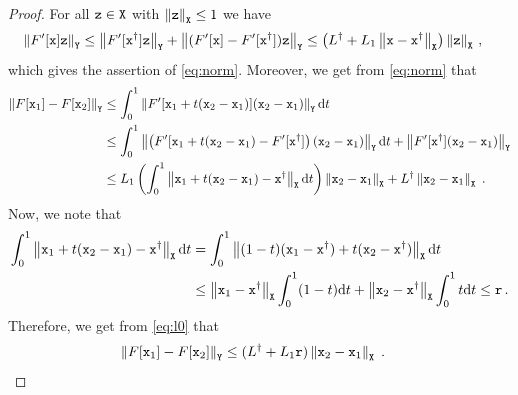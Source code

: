 \documentclass[10pt,a4paper]{amsart}
\newcommand{\X}{{\tt X}}
\newcommand{\Y}{{\tt Y}}
\newcommand{\norm}[1]{\left\|#1\right\|}
\newcommand{\x}{{\tt x}}
\newcommand{\xdag}{\x^\dagger}
\newcommand{\z}{{\tt z}}
\begin{document}
\begin{proof}
For all $\z \in \X$ with $\norm{\z}_\X \leq 1$ we have
\begin{equation*}
	\begin{aligned}
		\norm{F'[\x] \z}_\Y &\leq \norm{F'[\xdag] \z}_\Y + \norm{(F'[\x]-F'[\xdag]) \z}_\Y
		\leq \left( L^\dagger + L_1 \norm{\x-\xdag}_\X \right) \norm{\z}_\X\,,
	\end{aligned}
\end{equation*}	
which gives the assertion of \autoref{eq:norm}.
Moreover, we get from \autoref{eq:norm} that
\begin{equation} \label{eq:l0} \begin{aligned}
		\norm{F[\x_1]-F[\x_2]}_\Y &\leq \int_0^1 \norm{F'[\x_1+t(\x_2-\x_1)](\x_2-\x_1)}_\Y \mathrm{d}t \\&
		\leq \int_0^1 \norm{\left(F'[\x_1+t(\x_2-\x_1)-F'[\xdag]\right) (\x_2-\x_1)}_\Y \mathrm{d}t + \norm{F'[\xdag](\x_2-\x_1)}_\Y\\
		&\leq L_1 \left(\int_0^1 \norm{\x_1+t(\x_2-\x_1)-\xdag}_\X \mathrm{d}t\right) \norm{\x_2-\x_1}_\X + L^\dagger\norm{\x_2-\x_1}_\X \;.
	\end{aligned}
\end{equation}
Now, we note that 
\begin{equation*}
	\begin{aligned}
		\int_0^1 \norm{\x_1+t(\x_2-\x_1)-\xdag}_\X \mathrm{d}t 
		&= \int_0^1 \norm{(1-t)(\x_1-\xdag) +t (\x_2-\xdag)}_\X \mathrm{d}t\\
		&\leq \norm{\x_1-\xdag}_\X \int_0^1 (1-t) \mathrm{d}t  + \norm{\x_2-\xdag}_\X
		\int_0^1t \mathrm{d}t \leq {\tt r}\,.
	\end{aligned}
\end{equation*}
Therefore, we get from \autoref{eq:l0} that
\begin{equation*}\begin{aligned}
	\norm{F[\x_1]-F[\x_2]}_\Y &\leq (L^\dagger + L_1{\tt r}) \norm{\x_2-\x_1}_\X\;.
\end{aligned}
\end{equation*}
\end{proof}
\end{document}

